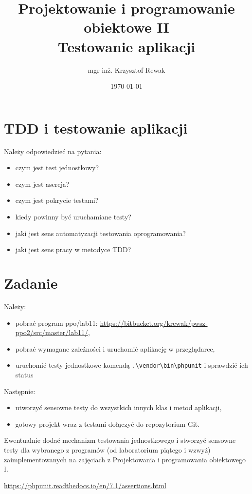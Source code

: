 \documentclass{article}
\title{
	Projektowanie i programowanie obiektowe II\\
	\Huge{Testowanie aplikacji}
}
\author{mgr inż. Krzysztof Rewak}
\date{\today}
\begin{document}
	\maketitle

	\section{TDD i testowanie aplikacji}
	Należy odpowiedzieć na pytania:
	\begin{itemize}
		\item czym jest test jednostkowy?
		\item czym jest asercja?
		\item czym jest pokrycie testami?
		\item kiedy powinny być uruchamiane testy?
		\item jaki jest sens automatyzacji testowania oprogramowania?
		\item jaki jest sens pracy w metodyce TDD?
	\end{itemize}
	
	\section{Zadanie}
	Należy:
	\begin{itemize}
		\item pobrać program ppo/lab11: \url{https://bitbucket.org/krewak/pwsz-ppo2/src/master/lab11/},
		\item pobrać wymagane zależności i uruchomić aplikację w przeglądarce,
		\item uruchomić testy jednostkowe komendą \texttt{.\textbackslash vendor\textbackslash bin\textbackslash phpunit} i sprawdzić ich status
	\end{itemize}
	
	Następnie:
	\begin{itemize}
		\item utworzyć sensowne testy do wszystkich innych klas i metod aplikacji,
		\item gotowy projekt wraz z testami dołączyć do repozytorium Git.
	\end{itemize}
	
	Ewentualnie dodać mechanizm testowania jednostkowego i stworzyć sensowne testy dla wybranego z programów (od laboratorium piątego i wzwyż) zaimplementowanych na zajęciach z Projektowania i programowania obiektowego I.
	
	\begin{thebibliography}{9}
	
		\url{https://phpunit.readthedocs.io/en/7.1/assertions.html}
	
	\end{thebibliography}
\end{document}

